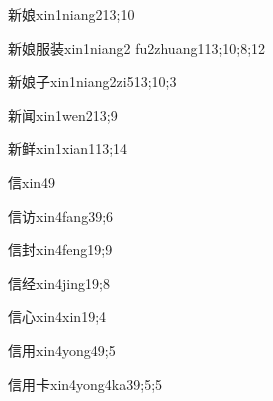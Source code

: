 \begin{verbete}{新娘}{xin1niang2}{13;10}
\end{verbete}

\begin{verbete}{新娘服装}{xin1niang2 fu2zhuang1}{13;10;8;12}
\end{verbete}

\begin{verbete}{新娘子}{xin1niang2zi5}{13;10;3}
\end{verbete}

\begin{verbete}{新闻}{xin1wen2}{13;9}
\end{verbete}

\begin{verbete}{新鲜}{xin1xian1}{13;14}
\end{verbete}

\begin{verbete}{信}{xin4}{9}
\end{verbete}

\begin{verbete}{信访}{xin4fang3}{9;6}
\end{verbete}

\begin{verbete}{信封}{xin4feng1}{9;9}
\end{verbete}

\begin{verbete}{信经}{xin4jing1}{9;8}
\end{verbete}

\begin{verbete}{信心}{xin4xin1}{9;4}
\end{verbete}

\begin{verbete}{信用}{xin4yong4}{9;5}
\end{verbete}

\begin{verbete}{信用卡}{xin4yong4ka3}{9;5;5}
\end{verbete}

